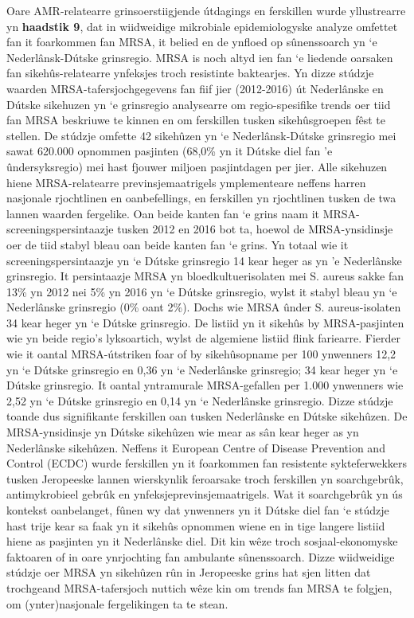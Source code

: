 \documentclass[
]{book}
\begin{document}
Oare AMR-relatearre grinsoerstiigjende útdagings en ferskillen wurde yllustrearre yn \textbf{haadstik 9}, dat in wiidweidige mikrobiale epidemiologyske analyze omfettet fan it foarkommen fan MRSA, it belied en de ynfloed op sûnenssoarch yn `e Nederlânsk-Dútske grinsregio. MRSA is noch altyd ien fan `e liedende oarsaken fan sikehûs-relatearre ynfeksjes troch resistinte baktearjes. Yn dizze stúdzje waarden MRSA-tafersjochgegevens fan fiif jier (2012-2016) út Nederlânske en Dútske sikehuzen yn `e grinsregio analysearre om regio-spesifike trends oer tiid fan MRSA beskriuwe te kinnen en om ferskillen tusken sikehûsgroepen fêst te stellen. De stúdzje omfette 42 sikehûzen yn `e Nederlânsk-Dútske grinsregio mei sawat 620.000 opnommen pasjinten (68,0\% yn it Dútske diel fan 'e ûndersyksregio) mei hast fjouwer miljoen pasjintdagen per jier. Alle sikehuzen hiene MRSA-relatearre previnsjemaatrigels ymplementeare neffens harren nasjonale rjochtlinen en oanbefellings, en ferskillen yn rjochtlinen tusken de twa lannen waarden fergelike. Oan beide kanten fan `e grins naam it MRSA-screeningspersintaazje tusken 2012 en 2016 bot ta, hoewol de MRSA-ynsidinsje oer de tiid stabyl bleau oan beide kanten fan `e grins. Yn totaal wie it screeningspersintaazje yn `e Dútske grinsregio 14 kear heger as yn 'e Nederlânske grinsregio. It persintaazje MRSA yn bloedkultuerisolaten mei S. aureus sakke fan 13\% yn 2012 nei 5\% yn 2016 yn `e Dútske grinsregio, wylst it stabyl bleau yn `e Nederlânske grinsregio (0\% oant 2\%). Dochs wie MRSA ûnder S. aureus-isolaten 34 kear heger yn `e Dútske grinsregio. De listiid yn it sikehûs by MRSA-pasjinten wie yn beide regio's lyksoartich, wylst de algemiene listiid flink fariearre. Fierder wie it oantal MRSA-útstriken foar of by sikehûsopname per 100 ynwenners 12,2 yn `e Dútske grinsregio en 0,36 yn `e Nederlânske grinsregio; 34 kear heger yn `e Dútske grinsregio. It oantal yntramurale MRSA-gefallen per 1.000 ynwenners wie 2,52 yn `e Dútske grinsregio en 0,14 yn `e Nederlânske grinsregio. Dizze stúdzje toande dus signifikante ferskillen oan tusken Nederlânske en Dútske sikehûzen. De MRSA-ynsidinsje yn Dútske sikehûzen wie mear as sân kear heger as yn Nederlânske sikehûzen. Neffens it European Centre of Disease Prevention and Control (ECDC) wurde ferskillen yn it foarkommen fan resistente sykteferwekkers tusken Jeropeeske lannen wierskynlik feroarsake troch ferskillen yn soarchgebrûk, antimykrobieel gebrûk en ynfeksjeprevinsjemaatrigels. Wat it soarchgebrûk yn ús kontekst oanbelanget, fûnen wy dat ynwenners yn it Dútske diel fan `e stúdzje hast trije kear sa faak yn it sikehûs opnommen wiene en in tige langere listiid hiene as pasjinten yn it Nederlânske diel. Dit kin wêze troch sosjaal-ekonomyske faktoaren of in oare ynrjochting fan ambulante sûnenssoarch. Dizze wiidweidige stúdzje oer MRSA yn sikehûzen rûn in Jeropeeske grins hat sjen litten dat trochgeand MRSA-tafersjoch nuttich wêze kin om trends fan MRSA te folgjen, om (ynter)nasjonale fergelikingen ta te stean.
\end{document}
